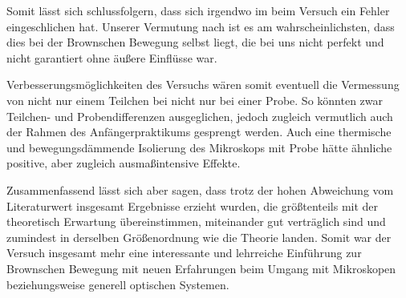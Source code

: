 \documentclass{article}
\begin{document}
Somit lässt sich schlussfolgern, dass sich irgendwo im beim Versuch ein Fehler eingeschlichen hat. Unserer Vermutung nach ist es am wahrscheinlichsten, dass dies bei der Brownschen Bewegung selbst liegt, die bei uns nicht perfekt und nicht garantiert ohne äußere Einflüsse war.

Verbesserungsmöglichkeiten des Versuchs wären somit eventuell die Vermessung von nicht nur einem Teilchen bei nicht nur bei einer Probe. So könnten zwar Teilchen- und Probendifferenzen ausgeglichen, jedoch zugleich vermutlich auch der Rahmen des Anfängerpraktikums gesprengt werden. Auch eine thermische und bewegungsdämmende Isolierung des Mikroskops mit Probe hätte ähnliche positive, aber zugleich ausmaßintensive Effekte.  

Zusammenfassend lässt sich aber sagen, dass trotz der hohen Abweichung vom Literaturwert insgesamt Ergebnisse erzieht wurden, die größtenteils mit der theoretisch Erwartung übereinstimmen, miteinander gut verträglich sind und zumindest in derselben Größenordnung wie die Theorie landen. Somit war der Versuch insgesamt mehr eine interessante und lehrreiche Einführung zur Brownschen Bewegung mit neuen Erfahrungen beim Umgang mit Mikroskopen beziehungsweise generell optischen Systemen.

\newpage

\end{document}
